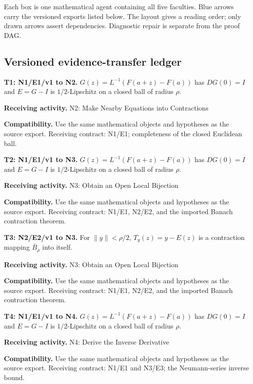 \documentclass[preprint,12pt,aps,pra,showkeys,amsmath,amssymb,superscriptaddress,floatfix]{revtex4-2}
\theoremstyle{definition}
\theoremstyle{remark}
\newcommand{\field}[2]{\par\smallskip\noindent\textbf{#1.} #2\par}
\begin{document}
Each box is one mathematical agent containing all five faculties. Blue
arrows carry the versioned exports listed below. The layout gives a
reading order; only drawn arrows assert dependencies. Diagnostic repair
is separate from the proof DAG.

\clearpage\subsection{Versioned evidence-transfer ledger}

\begingroup\small\linespread{1.05}\selectfont

\field{T1: N1/E1/v1 to N2}{\(G(z)=L^{-1}(F(a+z)-F(a))\) has \(DG(0)=I\) and \(E=G-I\) is
\(1/2\)-Lipschitz on a closed ball of radius \(\rho\).}

\field{Receiving activity}{N2: Make Nearby Equations into Contractions}

\field{Compatibility}{Use the same mathematical objects and hypotheses as the source export.
Receiving contract: N1/E1; completeness of the closed Euclidean ball.}

\field{T2: N1/E1/v1 to N3}{\(G(z)=L^{-1}(F(a+z)-F(a))\) has \(DG(0)=I\) and \(E=G-I\) is
\(1/2\)-Lipschitz on a closed ball of radius \(\rho\).}

\field{Receiving activity}{N3: Obtain an Open Local Bijection}

\field{Compatibility}{Use the same mathematical objects and hypotheses as the source export.
Receiving contract: N1/E1, N2/E2, and the imported Banach contraction
theorem.}

\field{T3: N2/E2/v1 to N3}{For \(\|y\|<\rho/2\), \(T_y(z)=y-E(z)\) is a contraction mapping
\(\overline B_\rho\) into itself.}

\field{Receiving activity}{N3: Obtain an Open Local Bijection}

\field{Compatibility}{Use the same mathematical objects and hypotheses as the source export.
Receiving contract: N1/E1, N2/E2, and the imported Banach contraction
theorem.}

\field{T4: N1/E1/v1 to N4}{\(G(z)=L^{-1}(F(a+z)-F(a))\) has \(DG(0)=I\) and \(E=G-I\) is
\(1/2\)-Lipschitz on a closed ball of radius \(\rho\).}

\field{Receiving activity}{N4: Derive the Inverse Derivative}

\field{Compatibility}{Use the same mathematical objects and hypotheses as the source export.
Receiving contract: N1/E1 and N3/E3; the Neumann-series inverse bound.}
\end{document}
